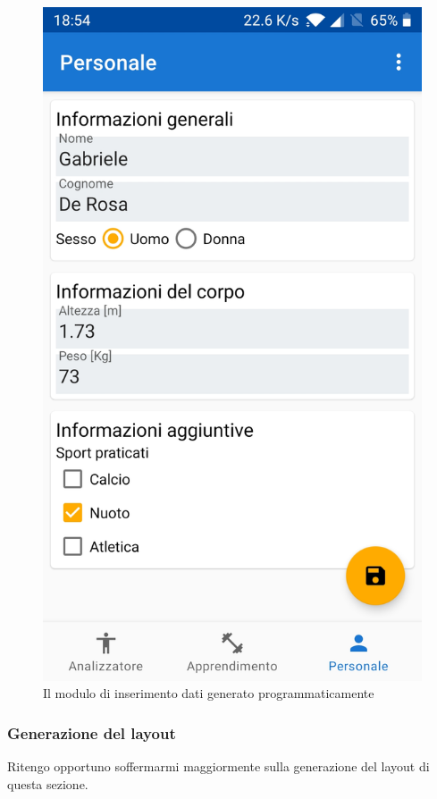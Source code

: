 \begin{figure}[H]
    \centering
    \includegraphics[scale = 0.1019]{assets/images/screenshots/3a_Init.jpg}    
    \caption{Il modulo di inserimento dati generato programmaticamente}
    \label{fig:screenshots_personal}
\end{figure}

\subsubsection{Generazione del layout}
Ritengo opportuno soffermarmi maggiormente sulla generazione del layout di questa sezione.

